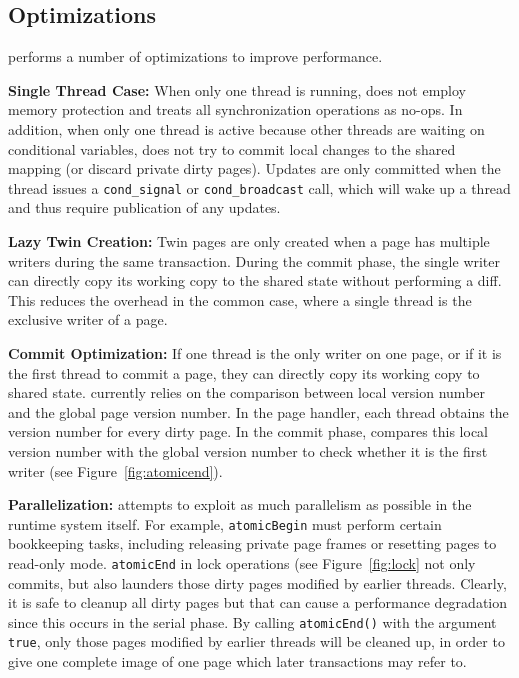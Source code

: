 \subsection{Optimizations}
\dthreads{} performs a number of optimizations to improve performance.

\textbf{Single Thread Case: }
When only one thread is running, \dthreads{} does not employ memory protection 
and treats all synchronization operations as no-ops.
In addition, when only one thread is active because other threads are waiting on conditional variables, 
\dthreads{} does not try to commit local changes to the shared mapping (or discard  
private dirty pages). Updates are only committed when the thread issues
a \texttt{cond\_signal} or \texttt{cond\_broadcast} call, which
will wake up a thread and thus require publication of any updates.

\textbf{Lazy Twin Creation: }
Twin pages are only created when a page has multiple writers during the same transaction.  
During the commit phase, the single writer can directly copy its working copy to the shared state 
without performing a diff. This reduces the overhead in the common case, 
where a single thread is the exclusive writer of a page.

\textbf{Commit Optimization: }
If one thread is the only writer on one page, or if it is the first thread to commit a page,
they can directly copy its working copy to shared state.
\dthreads{} currently relies on the comparison between local version number and the global page version number. 
In the page handler, each thread obtains the version number for every dirty page. 
In the commit phase, \dthreads{} compares this local version number with the global version
number to check whether it is the first writer (see Figure~\ref{fig:atomicend}).

\textbf{Parallelization: }
\dthreads{} attempts to exploit as much parallelism as possible in the runtime system itself.
For example, \texttt{atomicBegin} must perform certain bookkeeping
tasks, including releasing private page frames or resetting pages to
read-only mode.  \texttt{atomicEnd} in lock operations (see
Figure~\ref{fig:lock} not only commits, but also launders those dirty
pages modified by earlier threads.  Clearly, it is safe to cleanup all
dirty pages but that can cause a performance degradation since this
occurs in the serial phase.  By calling \texttt{atomicEnd()} with the
argument \texttt{true}, only those pages modified by earlier threads
will be cleaned up, in order to give one complete image of one page
which later transactions may refer to.
